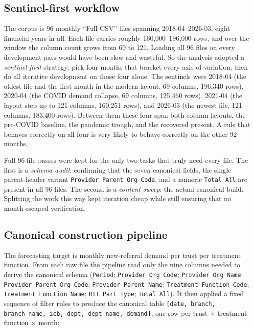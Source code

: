 \documentclass[11pt,a4paper]{article}
\begin{document}
\subsection{Sentinel-first workflow}
The corpus is 96 monthly ``Full CSV'' files spanning 2018-04--2026-03, eight financial years in all. Each file carries roughly 160,000--196,000 rows, and over the window the column count grows from 69 to 121. Loading all 96 files on every development pass would have been slow and wasteful. So the analysis adopted a \emph{sentinel-first} strategy: pick four months that bracket every axis of variation, then do all iterative development on those four alone. The sentinels were 2018-04 (the oldest file and the first month in the modern layout, 69 columns, 196,340 rows), 2020-04 (the COVID demand collapse, 69 columns, 125,460 rows), 2021-04 (the layout step up to 121 columns, 160,251 rows), and 2026-03 (the newest file, 121 columns, 183,400 rows). Between them these four span both column layouts, the pre-COVID baseline, the pandemic trough, and the recovered present. A rule that behaves correctly on all four is very likely to behave correctly on the other 92 months.

Full 96-file passes were kept for the only two tasks that truly need every file. The first is a \emph{schema audit}: confirming that the seven canonical fields, the single parent-header variant \texttt{Provider Parent Org Code}, and a numeric \texttt{Total All} are present in all 96 files. The second is a \emph{content sweep}: the actual canonical build. Splitting the work this way kept iteration cheap while still ensuring that no month escaped verification.

\subsection{Canonical construction pipeline}
The forecasting target is monthly new-referral demand per trust per treatment function. From each raw file the pipeline read only the nine columns needed to derive the canonical schema (\texttt{Period}; \texttt{Provider Org Code}; \texttt{Provider Org Name}; \texttt{Provider Parent Org Code}; \texttt{Provider Parent Name}; \texttt{Treatment Function Code}; \texttt{Treatment Function Name}; \texttt{RTT Part Type}; \texttt{Total All}). It then applied a fixed sequence of filter rules to produce the canonical table \texttt{[date, branch, branch\_name, icb, dept, dept\_name, demand]}, one row per trust $\times$ treatment-function $\times$ month:
\end{document}
